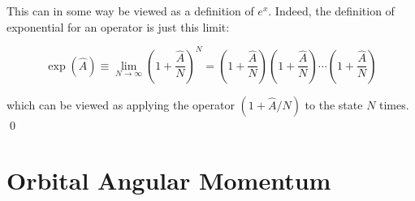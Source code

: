 \documentclass[12pt]{article}
\begin{document}
This can in some way be viewed as a definition of $e^{x}$. Indeed, the definition of exponential for an operator is just this limit:

\begin{equation}
    \exp(\hat{A}) \equiv \lim_{N \to \infty} \left( 1 + \frac{\hat{A}}{N} \right)^{N} = \left( 1 + \frac{\hat{A}}{N} \right) \left( 1 + \frac{\hat{A}}{N} \right) \cdots \left( 1 + \frac{\hat{A}}{N} \right)
\end{equation}

which can be viewed as applying the operator $(1 + \hat{A}/N)$ to the state $N$ times.
\qed






\pagebreak
\section*{Orbital Angular Momentum}
\end{document}
